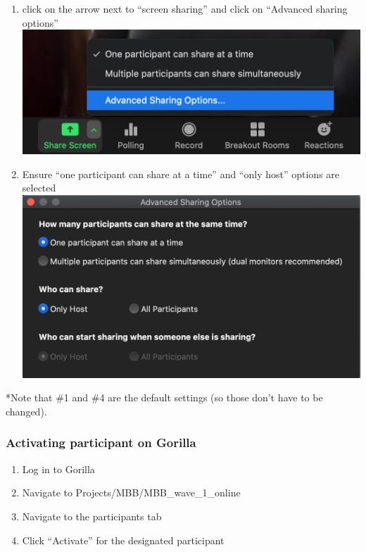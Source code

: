 \documentclass[]{book}
\providecommand{\tightlist}{%
  \setlength{\itemsep}{0pt}\setlength{\parskip}{0pt}}
\begin{document}
\begin{enumerate}
  \begin{enumerate}
  \def\labelenumii{\alph{enumii}.}
  \tightlist
  \item
    click on the arrow next to ``screen sharing'' and click on ``Advanced sharing options'' \includegraphics{images/zoom_security/2.png}
  \item
    Ensure ``one participant can share at a time'' and ``only host'' options are selected \includegraphics{images/zoom_security/3.png}
  \end{enumerate}
\end{enumerate}

*Note that \#1 and \#4 are the default settings (so those don't have to be changed).

\hypertarget{activating-participant-on-gorilla}{%
\subsubsection{Activating participant on Gorilla}\label{activating-participant-on-gorilla}}

\begin{enumerate}
\def\labelenumi{\arabic{enumi}.}
\tightlist
\item
  Log in to Gorilla
\item
  Navigate to Projects/MBB/MBB\_wave\_1\_online
\item
  Navigate to the participants tab
\item
  Click ``Activate'' for the designated participant
\end{enumerate}
\end{document}
